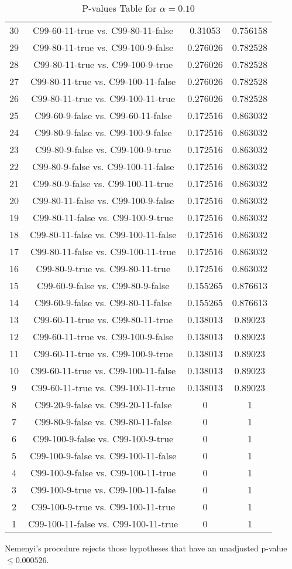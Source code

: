 \documentclass[a4paper,10pt]{article}
\begin{document}
\begin{landscape}
\begin{table}[!htp]
\begin{tabular}{cccc}
30&C99-60-11-true vs. C99-80-11-false&0.31053&0.756158\\
29&C99-80-11-true vs. C99-100-9-false&0.276026&0.782528\\
28&C99-80-11-true vs. C99-100-9-true&0.276026&0.782528\\
27&C99-80-11-true vs. C99-100-11-false&0.276026&0.782528\\
26&C99-80-11-true vs. C99-100-11-true&0.276026&0.782528\\
25&C99-60-9-false vs. C99-60-11-false&0.172516&0.863032\\
24&C99-80-9-false vs. C99-100-9-false&0.172516&0.863032\\
23&C99-80-9-false vs. C99-100-9-true&0.172516&0.863032\\
22&C99-80-9-false vs. C99-100-11-false&0.172516&0.863032\\
21&C99-80-9-false vs. C99-100-11-true&0.172516&0.863032\\
20&C99-80-11-false vs. C99-100-9-false&0.172516&0.863032\\
19&C99-80-11-false vs. C99-100-9-true&0.172516&0.863032\\
18&C99-80-11-false vs. C99-100-11-false&0.172516&0.863032\\
17&C99-80-11-false vs. C99-100-11-true&0.172516&0.863032\\
16&C99-80-9-true vs. C99-80-11-true&0.172516&0.863032\\
15&C99-60-9-false vs. C99-80-9-false&0.155265&0.876613\\
14&C99-60-9-false vs. C99-80-11-false&0.155265&0.876613\\
13&C99-60-11-true vs. C99-80-11-true&0.138013&0.89023\\
12&C99-60-11-true vs. C99-100-9-false&0.138013&0.89023\\
11&C99-60-11-true vs. C99-100-9-true&0.138013&0.89023\\
10&C99-60-11-true vs. C99-100-11-false&0.138013&0.89023\\
9&C99-60-11-true vs. C99-100-11-true&0.138013&0.89023\\
8&C99-20-9-false vs. C99-20-11-false&0&1\\
7&C99-80-9-false vs. C99-80-11-false&0&1\\
6&C99-100-9-false vs. C99-100-9-true&0&1\\
5&C99-100-9-false vs. C99-100-11-false&0&1\\
4&C99-100-9-false vs. C99-100-11-true&0&1\\
3&C99-100-9-true vs. C99-100-11-false&0&1\\
2&C99-100-9-true vs. C99-100-11-true&0&1\\
1&C99-100-11-false vs. C99-100-11-true&0&1\\
\hline
\end{tabular}
\caption{P-values Table for $\alpha=0.10$}
\end{table}Nemenyi's procedure rejects those hypotheses that have an unadjusted p-value $\le0.000526$.


\end{landscape}
\end{document}
